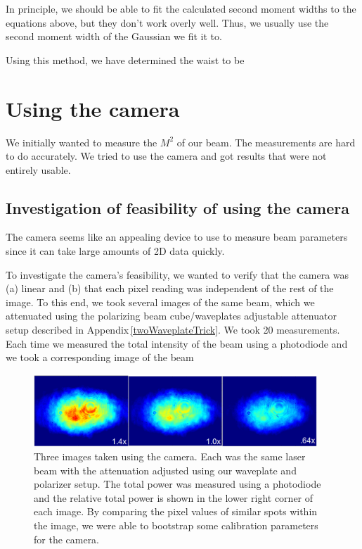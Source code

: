 In principle, we should be able to fit the calculated second moment widths to the equations above, but they don't work overly well. Thus, we usually use the second moment width of the Gaussian we fit it to. 

Using this method, we have determined the waist to be 


\section{Using the camera}
We initially wanted to measure the $M^2$ of our beam. The measurements are hard to do accurately. We tried to use the camera and got results that were not entirely usable.

\subsection{Investigation of feasibility of using the camera}

The camera seems like an appealing device to use to measure beam parameters since it can take large amounts of 2D data quickly.


To investigate the camera's feasibility, we wanted to verify that the camera was (a) linear and (b) that each pixel reading was independent of the rest of the image. To this end, we took several images of the same beam, which we attenuated using the polarizing beam cube/waveplates adjustable attenuator setup described in Appendix\,\ref{twoWaveplateTrick}. We took 20 measurements. Each time we measured the total intensity of the beam using a photodiode and we took a corresponding image of the beam

\begin{figure}
\centerline{
\includegraphics[width=0.95\textwidth]{cameraimage}
}
\caption[Sample camera images]{Three images taken using the camera. Each was the same laser beam with the attenuation adjusted using our waveplate and polarizer setup. The total power was measured using a photodiode and the relative total power is shown in the lower right corner of each image. By comparing the pixel values of similar spots within the image, we were able to bootstrap some calibration parameters for the camera.}
\end{figure}

